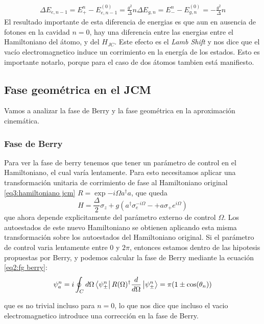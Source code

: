 \begin{equation}
    \begin{aligned}
        \Delta E_{e,n-1}=E_+^n-E^{(0)}_{e,n-1}=\frac{g^2}{\Delta}n
        \Delta E_{g,n}=E_-^n-E^{(0)}_{g,n}=-\frac{g^2}{\Delta}n
    \end{aligned}
\end{equation}
El resultado importante de esta diferencia de energias es que aun en ausencia de fotones en la cavidad $n=0$, hay una diferencia entre las energias entre el Hamiltoniano del átomo, y del $H_{JC}$. Este efecto es el \textit{Lamb Shift} y nos dice que el vac\'io electromagnetico induce un corrimiento en la energ\'ia de los estados. Esto es importante notarlo, porque para el caso de dos átomos tambien est\'a manifiesto.

\subsection{Fase geométrica en el JCM}
Vamos a analizar la fase de Berry y la fase geométrica en la aproximación cinemática.
\subsubsection{Fase de Berry}
Para ver la fase de berry tenemos que tener un parámetro de control en el Hamiltoniano, el cual varía lentamente. Para esto necesitamos aplicar una transformación unitaria de corrimiento de fase al Hamiltoniano original \ref{eq3:hamiltoniano jcm} $R=\exp{-i\Omega a^\dagger a}$, que queda
\begin{equation}
    H=\frac{\Delta}{2}\sigma_z+g(a^\dagger \sigma_e^{-i\Omega}-+a\sigma_+e^{i\Omega})
\end{equation}
que ahora depende explicitamente del parámetro externo de control $\Omega$. Los autoestados de este nuevo Hamiltoniano se obtienen aplicando esta misma transformación sobre los autoestados del Hamiltoniano original. Si el parámetro de control varia lentamente entre 0 y $2\pi$, entonces estamos dentro de las hipotesis propuestas por Berry, y podemos calcular la fase de Berry mediante la ecuación \ref{eq2:fg berry}:
\begin{equation}
    \psi_a^n=i\oint_Cd\Omega\bra{\psi_\pm^n}R(\Omega)^\dagger \frac{d}{d\Omega}\ket{\psi_\pm^n}=\pi(1\pm \cos(\theta_n))
\end{equation}

que es no trivial incluso para $n=0$, lo que nos dice que incluso el vacio electromagnetico introduce una corrección en la fase de Berry.
